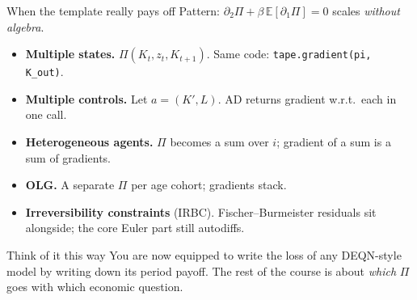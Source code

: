 \documentclass[aspectratio=169,11pt]{beamer}
\newcommand{\emphc}[1]{\textcolor{harvardcrimson}{#1}}
\begin{document}
\begin{frame}{When the template really pays off}
\small Pattern: $\partial_2 \Pi + \beta\,\mathbb{E}[\partial_1 \Pi] = 0$ scales \emph{without algebra}.
\vspace{2pt}
\begin{itemize}\itemsep3pt
\item \textbf{Multiple states.} $\Pi(K_t, z_t, K_{t+1})$. Same code: \texttt{tape.gradient(pi, K\_out)}.
\item \textbf{Multiple controls.} Let $a = (K', L)$. AD returns gradient w.r.t.\ each in one call.
\item \textbf{Heterogeneous agents.} $\Pi$ becomes a sum over $i$; gradient of a sum is a sum of gradients.
\item \textbf{OLG.} A separate $\Pi$ per age cohort; gradients stack.
\item \textbf{Irreversibility constraints} (IRBC). Fischer--Burmeister residuals sit alongside; the core Euler part still autodiffs.
\end{itemize}
\vspace{6pt}
\begin{exampleblock}{Think of it this way}
\small You are now equipped to write \emphc{the loss of any DEQN-style model} by writing down its period payoff. The rest of the course is about \emph{which} $\Pi$ goes with which economic question.
\end{exampleblock}
\end{frame}
\end{document}
